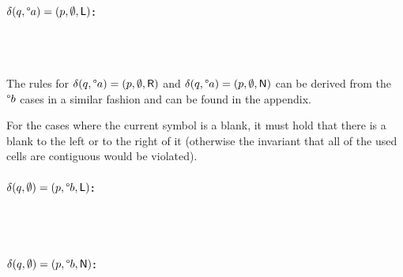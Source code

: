 \documentclass[a4paper,UKenglish,cleveref, autoref]{lipics-v2019}
\begin{document}
\paragraph*{$\delta(q, \degree a) = (p, \emptyset, \textsf{L})$:}
\begin{center}
   \\[3ex]
   \\[3ex]
\end{center}

The rules for $\delta(q, \degree a) = (p, \emptyset, \textsf{R})$ and $\delta(q, \degree a) = (p, \emptyset, \textsf{N})$ can be derived from the $\degree b$ cases in a similar fashion and can be found in the appendix.

For the cases where the current symbol is a blank, it must hold that there is a blank to the left or to the right of it (otherwise the invariant that all of the used cells are contiguous would be violated).
\paragraph*{$\delta(q, \emptyset) = (p, \degree b, \textsf{L})$:}
\begin{center}
   \\[3ex]
   \\[3ex]
\end{center}

\paragraph*{$\delta(q, \emptyset) = (p, \degree b, \textsf{N})$:}
\begin{center}
   \\[3ex]
   \\[3ex]
\end{center}
\end{document}
